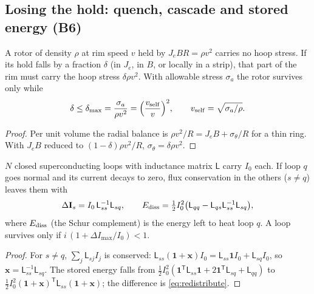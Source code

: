 \subsection{Losing the hold: quench, cascade and stored energy (B6)}
\begin{proposition}\label{prop:mismatch}
A rotor of density $\rho$ at rim speed $v$ held by $J_eBR=\rho v^2$ carries no hoop stress. If its hold falls by a fraction $\delta$ (in $J_e$,
in $B$, or locally in a strip), that part of the rim must carry the hoop stress $\delta\rho v^2$. With allowable stress $\sigma_a$ the rotor
survives only while
\begin{equation}
\delta\le\delta_{\max}=\frac{\sigma_a}{\rho v^2}=\Big(\frac{v_{\rm self}}{v}\Big)^2,\qquad v_{\rm self}=\sqrt{\sigma_a/\rho}.\label{eq:mismatch}
\end{equation}
\end{proposition}
\begin{proof}
Per unit volume the radial balance is $\rho v^2/R=J_eB+\sigma_\theta/R$ for a thin ring. With $J_eB$ reduced to $(1-\delta)\rho v^2/R$,
$\sigma_\theta=\delta\rho v^2$.
\end{proof}
\begin{theorem}\label{thm:redistribute}
$N$ closed superconducting loops with inductance matrix $\mathsf L$ carry $I_0$ each. If loop $q$ goes normal and its current decays to zero,
flux conservation in the others ($s\ne q$) leaves them with
\begin{equation}
\Delta\mathbf I_s=I_0\,\mathsf L_{ss}^{-1}\mathsf L_{sq},\qquad
E_{\rm diss}=\tfrac12I_0^2\big(\mathsf L_{qq}-\mathsf L_{qs}\mathsf L_{ss}^{-1}\mathsf L_{sq}\big),\label{eq:redistribute}
\end{equation}
where $E_{\rm diss}$ (the Schur complement) is the energy left to heat loop $q$. A loop survives only if $i\,(1+\Delta I_{\max}/I_0)<1$.
\end{theorem}
\begin{proof}
For $s\ne q$, $\sum_j\mathsf L_{sj}I_j$ is conserved: $\mathsf L_{ss}(\mathbf 1+\mathbf x)I_0=\mathsf L_{ss}\mathbf1I_0+\mathsf L_{sq}I_0$, so
$\mathbf x=\mathsf L_{ss}^{-1}\mathsf L_{sq}$. The stored energy falls from $\tfrac12I_0^2(\mathbf1^{\mathsf T}\mathsf L_{ss}\mathbf1+2\mathbf1^{\mathsf T}\mathsf L_{sq}
+\mathsf L_{qq})$ to $\tfrac12I_0^2(\mathbf1+\mathbf x)^{\mathsf T}\mathsf L_{ss}(\mathbf1+\mathbf x)$; the difference is \eqref{eq:redistribute}.
\end{proof}
